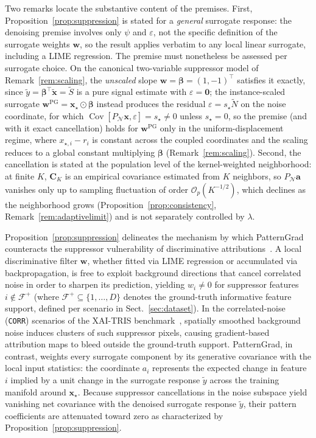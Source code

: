 \documentclass[pdflatex,sn-mathphys-num]{sn-jnl}
\theoremstyle{thmstyleone}
\theoremstyle{thmstyletwo}%
\theoremstyle{thmstylethree}%
\begin{document}
Two remarks locate the substantive content of the premises. First, Proposition~\ref{prop:suppression} is stated for a \emph{general} surrogate response: the denoising premise involves only $\psi$ and $\varepsilon$, not the specific definition of the surrogate weights $\mathbf{w}$, so the result applies verbatim to any local linear surrogate, including a LIME regression. The premise must nonetheless be assessed per surrogate choice. On the canonical two-variable suppressor model of Remark~\ref{rem:scaling}, the \emph{unscaled} slope $\mathbf{w} = \boldsymbol{\beta} = (1, -1)^\top$ satisfies it exactly, since $\tilde{y} = \boldsymbol{\beta}^\top \tilde{\mathbf{x}} = \tilde{S}$ is a pure signal estimate with $\varepsilon = \mathbf{0}$; the instance-scaled surrogate $\mathbf{w}^{\text{PG}} = \mathbf{x}_\star \odot \boldsymbol{\beta}$ instead produces the residual $\varepsilon = s_\star \tilde{N}$ on the noise coordinate, for which $\operatorname{Cov}[P_{\mathcal{N}}\mathbf{x}, \varepsilon] = s_\star \neq 0$ unless $s_\star = 0$, so the premise (and with it exact cancellation) holds for $\mathbf{w}^{\text{PG}}$ only in the uniform-displacement regime, where $x_{\star,i} - r_i$ is constant across the coupled coordinates and the scaling reduces to a global constant multiplying $\boldsymbol{\beta}$ (Remark~\ref{rem:scaling}). Second, the cancellation is stated at the population level of the kernel-weighted neighborhood: at finite $K$, $\mathbf{C}_K$ is an empirical covariance estimated from $K$ neighbors, so $P_{\mathcal{N}}\mathbf{a}$ vanishes only up to sampling fluctuation of order $\mathcal{O}_p(K^{-1/2})$, which declines as the neighborhood grows (Proposition~\ref{prop:consistency}, Remark~\ref{rem:adaptivelimit}) and is not separately controlled by $\lambda$.

Proposition~\ref{prop:suppression} delineates the mechanism by which PatternGrad counteracts the suppressor vulnerability of discriminative attributions~\cite{haufe2014, wilming2022}. A local discriminative filter $\mathbf{w}$, whether fitted via LIME regression or accumulated via backpropagation, is free to exploit background directions that cancel correlated noise in order to sharpen its prediction, yielding $w_i \neq 0$ for suppressor features $i \notin \mathcal{F}^+$ (where $\mathcal{F}^+ \subseteq \{1, \dots, D\}$ denotes the ground-truth informative feature support, defined per scenario in Sect.~\ref{sec:dataset}). In the correlated-noise (\texttt{CORR}) scenarios of the XAI-TRIS benchmark~\cite{clark2024}, spatially smoothed background noise induces clusters of such suppressor pixels, causing gradient-based attribution maps to bleed outside the ground-truth support. PatternGrad, in contrast, weights every surrogate component by its generative covariance with the local input statistics: the coordinate $a_i$ represents the expected change in feature $i$ implied by a unit change in the surrogate response $\tilde{y}$ across the training manifold around $\mathbf{x}_\star$. Because suppressor cancellations in the noise subspace yield vanishing net covariance with the denoised surrogate response $\tilde{y}$, their pattern coefficients are attenuated toward zero as characterized by Proposition~\ref{prop:suppression}.
\end{document}
